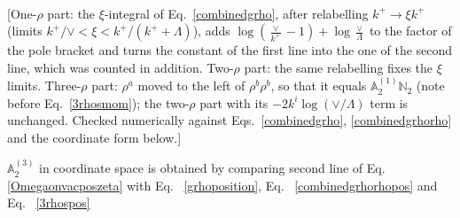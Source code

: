 \documentclass[aps,prd,amsmath,amssymb,nofootinbib]{revtex4-2}
\def\mf#1{\mathbb{#1}}
\numberwithin{equation}{section}
\begin{document}
\begin{align}
\end{align} {\color{red}[One-$\rho$ part: the $\xi$-integral of Eq.~\eqref{combinedgrho}, after relabelling $k^+\to\xi k^+$ (limits $k^+/\vee<\xi<k^+/(k^++\Lambda)$), adds $\log(\frac{\vee}{k^+}-1)+\log\frac{\vee}{\Lambda}$ to the factor of the pole bracket and turns the constant of the first line into the one of the second line, which was counted in addition. Two-$\rho$ part: the same relabelling fixes the $\xi$ limits. Three-$\rho$ part: $\rho^a$ moved to the left of $\rho^b\rho^b$, so that it equals $\mf{A}^{(1)}_2\mf{N}_2$ (note before Eq.~\eqref{3rhosmom}); the two-$\rho$ part with its $-2k^i\log(\vee/\Lambda)$ term is unchanged. Checked numerically against Eqs.~\eqref{combinedgrho}, \eqref{combinedgrhorho} and the coordinate form below.]}\par\noindent 
$ \mf{A}^{(3)}_{2}$ in coordinate space is obtained by comparing second line of Eq.~ \eqref{Omegaonvacposzeta} with Eq.~ \eqref{grhoposition}, Eq.~ \eqref{combinedgrhorhopos} and Eq.~ \eqref{3rhospos}
\end{document}
